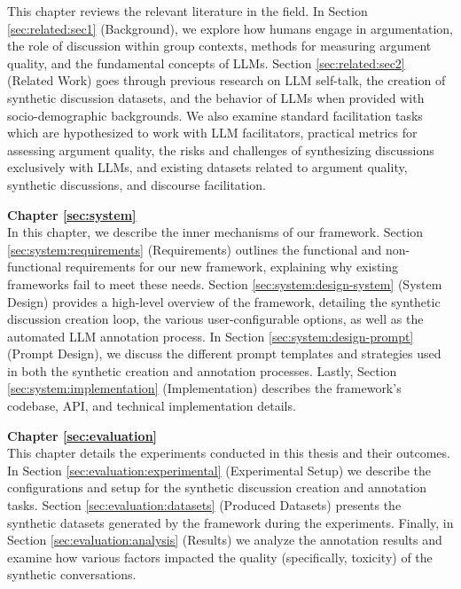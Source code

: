 This chapter reviews the relevant literature in the field. In Section \ref{sec:related:sec1} (Background), we explore how humans engage in argumentation, the role of discussion within group contexts, methods for measuring argument quality, and the fundamental concepts of \acp{LLM}. Section \ref{sec:related:sec2} (Related Work) goes through previous research on LLM self-talk, the creation of synthetic discussion datasets, and the behavior of LLMs when provided with socio-demographic backgrounds. We also examine standard facilitation tasks which are hypothesized to work with LLM facilitators, practical metrics for assessing argument quality, the risks and challenges of synthesizing discussions exclusively with LLMs, and existing datasets related to argument quality, synthetic discussions, and discourse facilitation.


\textbf{Chapter \ref{sec:system}} \\[0.2em]

In this chapter, we describe the inner mechanisms of our framework. Section \ref{sec:system:requirements} (Requirements) outlines the functional and non-functional requirements for our new framework, explaining why existing frameworks fail to meet these needs. Section \ref{sec:system:design-system} (System Design) provides a high-level overview of the framework, detailing the synthetic discussion creation loop, the various user-configurable options, as well as the automated LLM annotation process. In Section \ref{sec:system:design-prompt} (Prompt Design), we discuss the different prompt templates and strategies used in both the synthetic creation and annotation processes. Lastly, Section \ref{sec:system:implementation} (Implementation) describes the framework's codebase, \ac{API}, and technical implementation details.

\textbf{Chapter \ref{sec:evaluation}} \\[0.2em]

This chapter details the experiments conducted in this thesis and their outcomes. In Section \ref{sec:evaluation:experimental} (Experimental Setup) we describe the configurations and setup for the synthetic discussion creation and annotation tasks. Section \ref{sec:evaluation:datasets} (Produced Datasets)  presents the synthetic datasets generated by the framework during the experiments.  Finally, in Section \ref{sec:evaluation:analysis} (Results) we analyze the annotation results and examine how various factors impacted the quality (specifically, toxicity) of the synthetic conversations.


